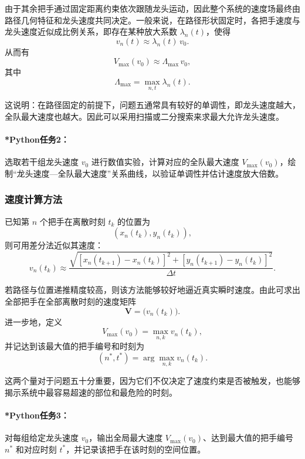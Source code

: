 \documentclass[12pt,a4paper]{ctexart}
\begin{document}
由于其余把手通过固定距离约束依次跟随龙头运动，因此整个系统的速度场最终由路径几何特征和龙头速度共同决定。一般来说，在路径形状固定时，各把手速度与龙头速度近似成比例关系，即存在某种放大系数 $\lambda_n(t)$，使得
\begin{equation}
v_n(t)\approx \lambda_n(t)\,v_0.
\end{equation}
从而有
\begin{equation}
V_{\max}(v_0)\approx \Lambda_{\max}\,v_0,
\end{equation}
其中
\begin{equation}
\Lambda_{\max}=\max_{n,t}\lambda_n(t).
\end{equation}

这说明：在路径固定的前提下，问题五通常具有较好的单调性，即龙头速度越大，全队最大速度也越大。因此可以采用扫描或二分搜索来求最大允许龙头速度。

\paragraph{*Python任务2：}
选取若干组龙头速度 $v_0$ 进行数值实验，计算对应的全队最大速度 $V_{\max}(v_0)$，绘制“龙头速度—全队最大速度”关系曲线，以验证单调性并估计速度放大倍数。

\subsubsection{速度计算方法}
已知第 $n$ 个把手在离散时刻 $t_k$ 的位置为
\[
(x_n(t_k),y_n(t_k)),
\]
则可用差分法近似其速度：
\begin{equation}
v_n(t_k)\approx
\frac{\sqrt{[x_n(t_{k+1})-x_n(t_k)]^2+[y_n(t_{k+1})-y_n(t_k)]^2}}{\Delta t}.
\end{equation}

若路径与位置递推精度较高，则该方法能够较好地逼近真实瞬时速度。由此可求出全部把手在全部离散时刻的速度矩阵
\begin{equation}
\bm{V}=\bigl(v_n(t_k)\bigr).
\end{equation}
进一步地，定义
\begin{equation}
V_{\max}(v_0)=\max_{n,k} v_n(t_k),
\end{equation}
并记达到该最大值的把手编号和时刻为
\begin{equation}
(n^\ast,t^\ast)=\arg\max_{n,k} v_n(t_k).
\end{equation}

这两个量对于问题五十分重要，因为它们不仅决定了速度约束是否被触发，也能够揭示系统中最容易超速的部位和最危险的时刻。

\paragraph{*Python任务3：}
对每组给定龙头速度 $v_0$，输出全局最大速度 $V_{\max}(v_0)$、达到最大值的把手编号 $n^\ast$ 和对应时刻 $t^\ast$，并记录该把手在该时刻的空间位置。
\end{document}

